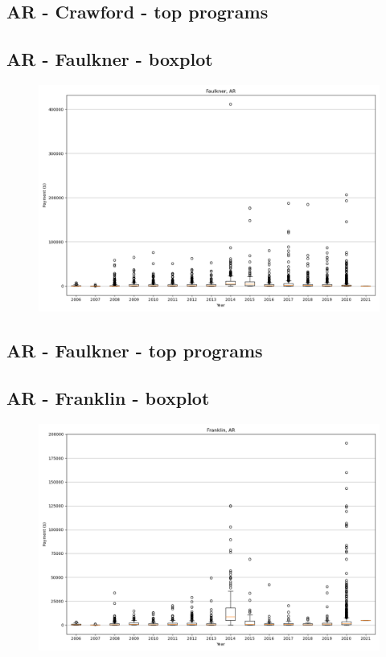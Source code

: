\subsection*{AR - Crawford - top programs}

\newpage
\subsection*{AR - Faulkner - boxplot}
\begin{figure}[h]
\centering
\includegraphics[width=7in]{../output/boxplots/counties/Faulkner-AR_boxplot.png}
\end{figure}


\subsection*{AR - Faulkner - top programs}

\newpage
\subsection*{AR - Franklin - boxplot}
\begin{figure}[h]
\centering
\includegraphics[width=7in]{../output/boxplots/counties/Franklin-AR_boxplot.png}
\end{figure}


